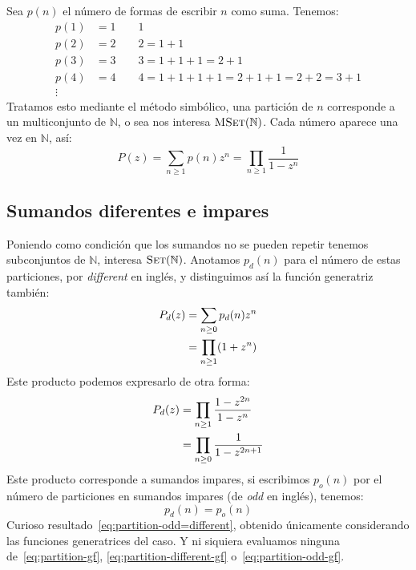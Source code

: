   Sea \(p(n)\) el número de formas de escribir \(n\) como suma.
  Tenemos:
  \begin{align*}
    p(1)
      &= 1 \qquad 1 \\
    p(2)
      &= 2 \qquad 2 = 1 + 1 \\
    p(3)
      &= 3 \qquad 3 = 1 + 1 + 1 = 2 + 1 \\
    p(4)
      &= 4 \qquad 4 = 1 + 1 + 1 + 1 = 2 + 1 + 1 = 2 + 2 = 3 + 1 \\
    \vdots
  \end{align*}
  Tratamos esto mediante el método simbólico,
  una partición de \(n\)
  corresponde a un multiconjunto de \(\mathbb{N}\),
  o sea nos interesa \(\operatorname{\textsc{MSet}}(\mathbb{N})\).
  Cada número aparece una vez en \(\mathbb{N}\),
  así:
  \begin{equation}
    \label{eq:partition-gf}
    P(z)
      = \sum_{n \ge 1} p(n) z^n
      = \prod_{n \ge 1} \frac{1}{1 - z^n}
  \end{equation}

\subsection{Sumandos diferentes e impares}
\label{sec:particiones-diferentes}

  Poniendo como condición
  que los sumandos no se pueden repetir
  tenemos subconjuntos de \(\mathbb{N}\),
  interesa \(\operatorname{\textsc{Set}}(\mathbb{N})\).
  Anotamos \(p_d(n)\) para el número de estas particiones,
  por \emph{\foreignlanguage{english}{different}} en inglés,
  y distinguimos así la función generatriz también:
  \begin{align}
    P_d(z)
      &= \sum_{n \ge 0} p_d (n) z^n \notag \\
      &= \prod_{n \ge 1} (1 + z^n)
	    \label{eq:partition-different-gf}
  \end{align}
  Este producto podemos expresarlo de otra forma:
  \begin{align}
    P_d(z)
      &= \prod_{n \ge 1} \frac{1 - z^{2 n}}{1 - z^n} \notag \\
      &= \prod_{n \ge 0} \frac{1}{1 - z^{2 n + 1}}
	    \label{eq:partition-odd-gf}
  \end{align}
  Este producto corresponde a sumandos impares,
  si escribimos \(p_o(n)\)
  por el número de particiones en sumandos impares
  (de \emph{\foreignlanguage{english}{odd}} en inglés),
  tenemos:
  \begin{equation}
    \label{eq:partition-odd=different}
    p_d(n) = p_o(n)
  \end{equation}
  Curioso resultado~\eqref{eq:partition-odd=different},
  obtenido únicamente
  considerando las funciones generatrices del caso.
  Y ni siquiera evaluamos ninguna de~\eqref{eq:partition-gf},
  \eqref{eq:partition-different-gf} o~\eqref{eq:partition-odd-gf}.

